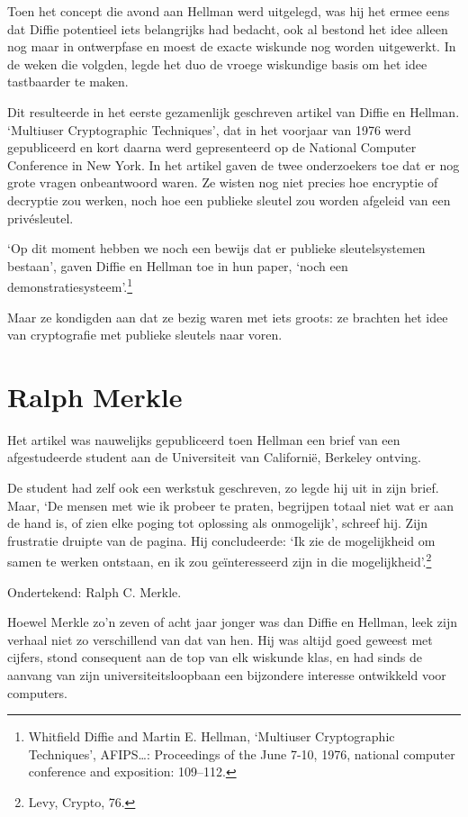\documentclass[
  a5paper,
  smalldemyvopaper,11pt,twoside,onecolumn,openright,extrafontsizes]{memoir}
\begin{document}
Toen het concept die avond aan Hellman werd uitgelegd, was hij het ermee
eens dat Diffie potentieel iets belangrijks had bedacht, ook al bestond
het idee alleen nog maar in ontwerpfase en moest de exacte wiskunde nog
worden uitgewerkt. In de weken die volgden, legde het duo de vroege
wiskundige basis om het idee tastbaarder te maken.

Dit resulteerde in het eerste gezamenlijk geschreven artikel van Diffie
en Hellman. `Multiuser Cryptographic Techniques', dat in het voorjaar
van 1976 werd gepubliceerd en kort daarna werd gepresenteerd op de
National Computer Conference in New York. In het artikel gaven de twee
onderzoekers toe dat er nog grote vragen onbeantwoord waren. Ze wisten
nog niet precies hoe encryptie of decryptie zou werken, noch hoe een
publieke sleutel zou worden afgeleid van een privésleutel.

`Op dit moment hebben we noch een bewijs dat er publieke sleutelsystemen
bestaan', gaven Diffie en Hellman toe in hun paper, `noch een
demonstratiesysteem'.\footnote{Whitfield Diffie and Martin E. Hellman,
  `Multiuser Cryptographic Techniques', AFIPS\ldots: Proceedings of the
  June 7-10, 1976, national computer conference and exposition:
  109--112.}

Maar ze kondigden aan dat ze bezig waren met iets groots: ze brachten
het idee van cryptografie met publieke sleutels naar voren.

\section{Ralph Merkle}\label{ralph-merkle}

Het artikel was nauwelijks gepubliceerd toen Hellman een brief van een
afgestudeerde student aan de Universiteit van Californië, Berkeley
ontving.

De student had zelf ook een werkstuk geschreven, zo legde hij uit in
zijn brief. Maar, `De mensen met wie ik probeer te praten, begrijpen
totaal niet wat er aan de hand is, of zien elke poging tot oplossing als
onmogelijk', schreef hij. Zijn frustratie druipte van de pagina. Hij
concludeerde: `Ik zie de mogelijkheid om samen te werken ontstaan, en ik
zou geïnteresseerd zijn in die mogelijkheid'.\footnote{\hspace{0pt}Levy,
  Crypto, 76.}

Ondertekend: Ralph C. Merkle.

Hoewel Merkle zo'n zeven of acht jaar jonger was dan Diffie en Hellman,
leek zijn verhaal niet zo verschillend van dat van hen. Hij was altijd
goed geweest met cijfers, stond consequent aan de top van elk wiskunde
klas, en had sinds de aanvang van zijn universiteitsloopbaan een
bijzondere interesse ontwikkeld voor computers.
\end{document}

